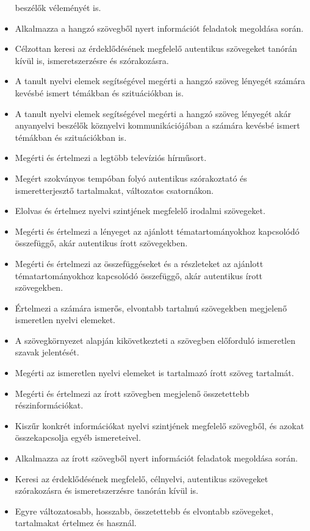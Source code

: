 \begin{itemize}
  beszélők véleményét is.
\item
  Alkalmazza a hangzó szövegből nyert információt feladatok megoldása
  során.
\item
  Célzottan keresi az érdeklődésének megfelelő autentikus szövegeket
  tanórán kívül is, ismeretszerzésre és szórakozásra.
\item
  A tanult nyelvi elemek segítségével megérti a hangzó szöveg lényegét
  számára kevésbé ismert témákban és szituációkban is.
\item
  A tanult nyelvi elemek segítségével megérti a hangzó szöveg lényegét
  akár anyanyelvi beszélők köznyelvi kommunikációjában a számára kevésbé
  ismert témákban és szituációkban is.
\item
  Megérti és értelmezi a legtöbb televíziós hírműsort.
\item
  Megért szokványos tempóban folyó autentikus szórakoztató és
  ismeretterjesztő tartalmakat, változatos csatornákon.
\item
  Elolvas és értelmez nyelvi szintjének megfelelő irodalmi szövegeket.
\item
  Megérti és értelmezi a lényeget az ajánlott tématartományokhoz
  kapcsolódó összefüggő, akár autentikus írott szövegekben.
\item
  Megérti és értelmezi az összefüggéseket és a részleteket az ajánlott
  tématartományokhoz kapcsolódó összefüggő, akár autentikus írott
  szövegekben.
\item
  Értelmezi a számára ismerős, elvontabb tartalmú szövegekben megjelenő
  ismeretlen nyelvi elemeket.
\item
  A szövegkörnyezet alapján kikövetkezteti a szövegben előforduló
  ismeretlen szavak jelentését.
\item
  Megérti az ismeretlen nyelvi elemeket is tartalmazó írott szöveg
  tartalmát.
\item
  Megérti és értelmezi az írott szövegben megjelenő összetettebb
  részinformációkat.
\item
  Kiszűr konkrét információkat nyelvi szintjének megfelelő szövegből, és
  azokat összekapcsolja egyéb ismereteivel.
\item
  Alkalmazza az írott szövegből nyert információt feladatok megoldása
  során.
\item
  Keresi az érdeklődésének megfelelő, célnyelvi, autentikus szövegeket
  szórakozásra és ismeretszerzésre tanórán kívül is.
\item
  Egyre változatosabb, hosszabb, összetettebb és elvontabb szövegeket,
  tartalmakat értelmez és használ.

\end{itemize}
